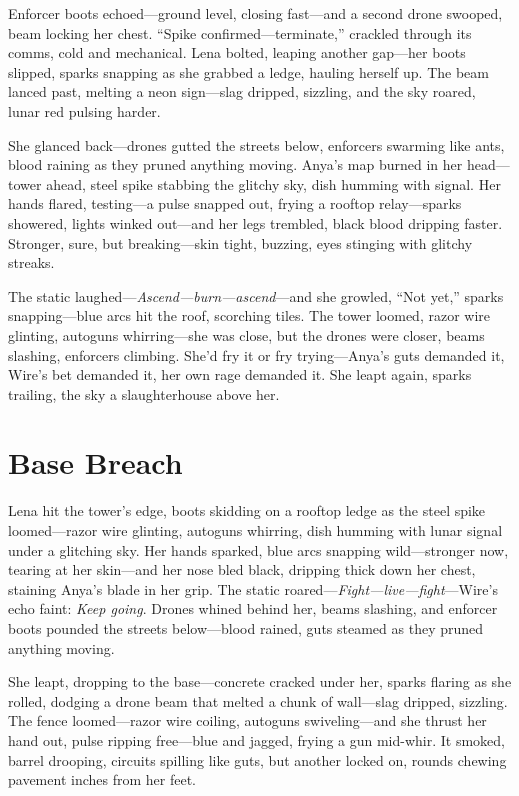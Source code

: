 \documentclass[12pt]{book}
\begin{document}
Enforcer boots echoed---ground level, closing fast---and a second drone swooped, beam locking her chest. ``Spike confirmed---terminate,'' crackled through its comms, cold and mechanical. Lena bolted, leaping another gap---her boots slipped, sparks snapping as she grabbed a ledge, hauling herself up. The beam lanced past, melting a neon sign---slag dripped, sizzling, and the sky roared, lunar red pulsing harder.

She glanced back---drones gutted the streets below, enforcers swarming like ants, blood raining as they pruned anything moving. Anya’s map burned in her head---tower ahead, steel spike stabbing the glitchy sky, dish humming with signal. Her hands flared, testing---a pulse snapped out, frying a rooftop relay---sparks showered, lights winked out---and her legs trembled, black blood dripping faster. Stronger, sure, but breaking---skin tight, buzzing, eyes stinging with glitchy streaks.

The static laughed---\emph{Ascend---burn---ascend}---and she growled, ``Not yet,'' sparks snapping---blue arcs hit the roof, scorching tiles. The tower loomed, razor wire glinting, autoguns whirring---she was close, but the drones were closer, beams slashing, enforcers climbing. She’d fry it or fry trying---Anya’s guts demanded it, Wire’s bet demanded it, her own rage demanded it. She leapt again, sparks trailing, the sky a slaughterhouse above her.

\section{Base Breach}

Lena hit the tower’s edge, boots skidding on a rooftop ledge as the steel spike loomed---razor wire glinting, autoguns whirring, dish humming with lunar signal under a glitching sky. Her hands sparked, blue arcs snapping wild---stronger now, tearing at her skin---and her nose bled black, dripping thick down her chest, staining Anya’s blade in her grip. The static roared---\emph{Fight---live---fight}---Wire’s echo faint: \emph{Keep going}. Drones whined behind her, beams slashing, and enforcer boots pounded the streets below---blood rained, guts steamed as they pruned anything moving.

She leapt, dropping to the base---concrete cracked under her, sparks flaring as she rolled, dodging a drone beam that melted a chunk of wall---slag dripped, sizzling. The fence loomed---razor wire coiling, autoguns swiveling---and she thrust her hand out, pulse ripping free---blue and jagged, frying a gun mid-whir. It smoked, barrel drooping, circuits spilling like guts, but another locked on, rounds chewing pavement inches from her feet.
\end{document}
